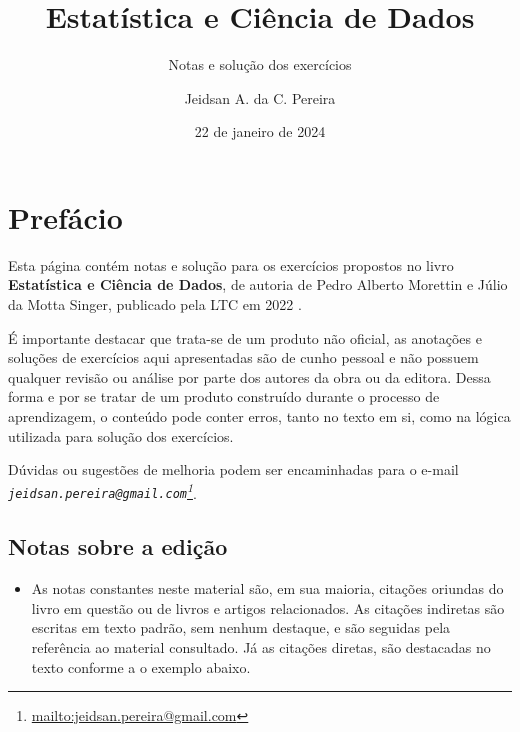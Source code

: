 \documentclass[
]{latex/krantz}
\title{Estatística e Ciência de Dados}
\subtitle{Notas e solução dos exercícios}
\author{Jeidsan A. da C. Pereira}
\date{22 de janeiro de 2024}
\providecommand{\tightlist}{%
  \setlength{\itemsep}{0pt}\setlength{\parskip}{0pt}}
\renewcommand{\href}[2]{#2\footnote{\url{#1}}}
\theoremstyle{definition}
\theoremstyle{definition}
\theoremstyle{definition}
\theoremstyle{definition}
\theoremstyle{remark}
\begin{document}
\maketitle

\thispagestyle{empty}
\begin{center}
\end{center}

\setlength{\abovedisplayskip}{-5pt}
\setlength{\abovedisplayshortskip}{-5pt}

{
\setcounter{tocdepth}{1}
\tableofcontents
}
\hypertarget{prefuxe1cio}{%
\chapter*{Prefácio}\label{prefuxe1cio}}

Esta página contém notas e solução para os exercícios propostos no livro \textbf{Estatística e Ciência de Dados}, de autoria de Pedro Alberto Morettin e Júlio da Motta Singer, publicado pela LTC em 2022 \citep{MorettinSinger2022}.

É importante destacar que trata-se de um produto não oficial, as anotações e soluções de exercícios aqui apresentadas são de cunho pessoal e não possuem qualquer revisão ou análise por parte dos autores da obra ou da editora. Dessa forma e por se tratar de um produto construído durante o processo de aprendizagem, o conteúdo pode conter erros, tanto no texto em si, como na lógica utilizada para solução dos exercícios.

Dúvidas ou sugestões de melhoria podem ser encaminhadas para o e-mail \emph{\href{mailto:jeidsan.pereira@gmail.com}{\nolinkurl{jeidsan.pereira@gmail.com}}}.

\hypertarget{notas-sobre-a-ediuxe7uxe3o}{%
\section*{Notas sobre a edição}\label{notas-sobre-a-ediuxe7uxe3o}}

\begin{itemize}
\tightlist
\item
  As notas constantes neste material são, em sua maioria, citações oriundas do livro em questão ou de livros e artigos relacionados. As citações indiretas são escritas em texto padrão, sem nenhum destaque, e são seguidas pela referência ao material consultado. Já as citações diretas, são destacadas no texto conforme a o exemplo abaixo.
\end{itemize}
\end{document}
